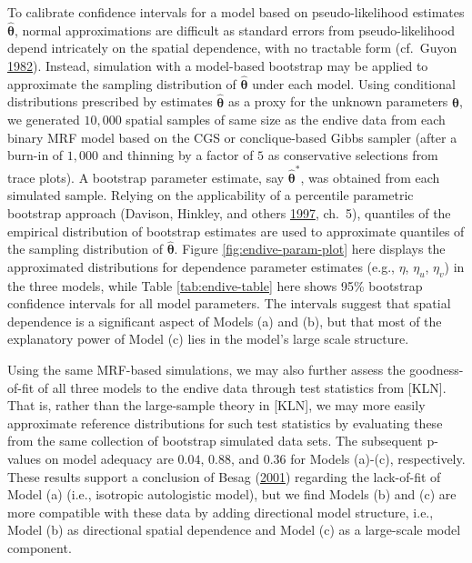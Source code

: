 \documentclass[12pt]{article}
\theoremstyle{definition}
\begin{document}
To calibrate confidence intervals for a model based on pseudo-likelihood estimates \(\widehat{\boldsymbol \theta}\), normal approximations are difficult as standard errors from pseudo-likelihood depend intricately on the spatial dependence, with no tractable form (cf.~Guyon \protect\hyperlink{ref-guyon1982parameter}{1982}). Instead, simulation with a model-based bootstrap may be applied to approximate the sampling distribution of \(\widehat{\boldsymbol \theta}\) under each model. Using conditional distributions prescribed by estimates \(\widehat{\boldsymbol \theta}\) as a proxy for the unknown parameters \(\boldsymbol \theta\), we generated \(10,000\) spatial samples of same size as the endive data from each binary MRF model based on the CGS or conclique-based Gibbs sampler (after a burn-in of \(1,000\) and thinning by a factor of \(5\) as conservative selections from trace plots). A bootstrap parameter estimate, say \(\widehat{\boldsymbol \theta}^*\), was obtained from each simulated sample. Relying on the applicability of a percentile parametric bootstrap approach (Davison, Hinkley, and others \protect\hyperlink{ref-davison1997bootstrap}{1997}, ch.~5), quantiles of the empirical distribution of bootstrap estimates are used to approximate quantiles of the sampling distribution of \(\widehat{\boldsymbol \theta}\). Figure \ref{fig:endive-param-plot} here displays the approximated distributions for dependence parameter estimates (e.g., \(\eta\), \(\eta_u\), \(\eta_v\)) in the three models, while Table \ref{tab:endive-table} here shows 95\% bootstrap confidence intervals for all model parameters. The intervals suggest that spatial dependence is a significant aspect of Models (a) and (b), but that most of the explanatory power of Model (c) lies in the model's large scale structure.

Using the same MRF-based simulations, we may also further assess the goodness-of-fit of all three models to the endive data through test statistics from {[}KLN{]}. That is, rather than the large-sample theory in {[}KLN{]}, we may more easily approximate reference distributions for such test statistics by evaluating these from the same collection of bootstrap simulated data sets. The subsequent p-values on model adequacy are \(0.04\), \(0.88\), and \(0.36\) for Models (a)-(c), respectively. These results support a conclusion of Besag (\protect\hyperlink{ref-besag2001markov}{2001}) regarding the lack-of-fit of Model (a) (i.e., isotropic autologistic model), but we find Models (b) and (c) are more compatible with these data by adding directional model structure, i.e., Model (b) as directional spatial dependence and Model (c) as a large-scale model component.
\end{document}
